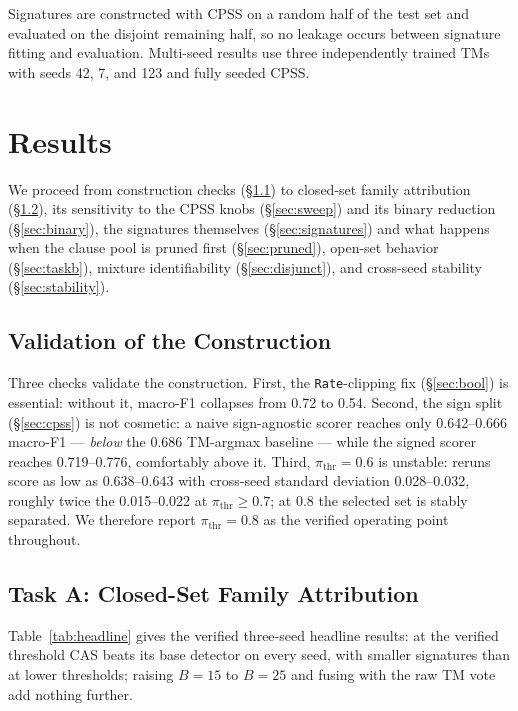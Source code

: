 \documentclass[conference]{IEEEtran}
\begin{document}
Signatures are constructed with CPSS on a random half of the test set and
evaluated on the disjoint remaining half, so no leakage occurs between
signature fitting and evaluation. Multi-seed results use three
independently trained TMs with seeds 42, 7, and 123 and fully seeded CPSS.

\section{Results}
We proceed from construction checks
(\S\ref{sec:validation}) to closed-set family attribution
(\S\ref{sec:taska}), its sensitivity to the CPSS knobs
(\S\ref{sec:sweep}) and its binary reduction (\S\ref{sec:binary}), the
signatures themselves (\S\ref{sec:signatures}) and what happens when the
clause pool is pruned first (\S\ref{sec:pruned}), open-set behavior
(\S\ref{sec:taskb}), mixture identifiability
(\S\ref{sec:disjunct}), and cross-seed stability (\S\ref{sec:stability}).

\subsection{Validation of the Construction}
\label{sec:validation}
Three checks validate the construction.
First, the \texttt{Rate}-clipping fix
(\S\ref{sec:bool}) is essential: without it, macro-F1 collapses from 0.72 to
0.54. Second, the sign split
(\S\ref{sec:cpss}) is not cosmetic: a naive sign-agnostic scorer reaches
only 0.642--0.666 macro-F1 --- \emph{below} the 0.686 TM-argmax baseline
--- while the signed scorer reaches 0.719--0.776, comfortably above it. Third, $\pi_{\mathrm{thr}}=0.6$ is unstable: reruns score as low as
0.638--0.643 with cross-seed standard deviation 0.028--0.032, roughly
twice the 0.015--0.022 at $\pi_{\mathrm{thr}} \ge 0.7$; at 0.8
the selected set is stably separated. We therefore report
$\pi_{\mathrm{thr}}=0.8$ as the verified operating point throughout.
\subsection{Task A: Closed-Set Family Attribution}
\label{sec:taska}
Table~\ref{tab:headline} gives the verified three-seed headline results:
at the verified threshold CAS beats its base detector on every seed, with
smaller signatures than at lower thresholds; raising $B{=}15$ to
$B{=}25$ and fusing with the raw TM vote add nothing further.
\end{document}
